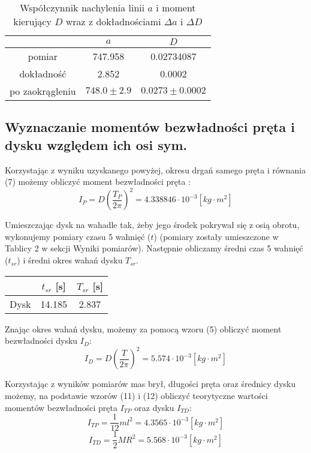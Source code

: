 \documentclass[10pt,a4paper]{article}
\newcommand{\forceindent}{\leavevmode{\parindent=3em\indent}}
\begin{document}
\begin{table}[!h]
\centering
\begin{tabular}{|cc||c|}
\multicolumn{1}{c}{} & \multicolumn{1}{c}{$a$} & \multicolumn{1}{c}{$D$}\\
\hline
pomiar & 747.958& 0.02734087\\
\hline
dokładność & 2.852 & 0.0002\\
\hline
po zaokrągleniu & $ 748.0 \pm 2.9 $  & $ 0.0273 \pm 0.0002 $ \\
\hline
\end{tabular}
\caption{Współczynnik nachylenia linii $a$ i moment kierujący $D$ wraz z dokładnościami $\Delta a$ i $\Delta D$}
\end{table}

\subsection{Wyznaczanie momentów bezwładności pręta i dysku względem ich osi sym.}
\forceindent Korzystając z wyniku uzyskanego powyżej, okresu drgań samego pręta i równania (7) możemy obliczyć moment bezwładności pręta :
\begin{equation}
I_P = D \left(\frac{T_P}{2\pi}\right)^2 = 4.338846\cdot 10^{-3} \left[kg\cdot m^2\right]
\end{equation}

\forceindent Umieszczając dysk na wahadle tak, żeby jego środek pokrywał się z osią obrotu, wykonujemy pomiary czasu 5 wahnięć ($t$) (pomiary zostały umieszczone w Tablicy 2 w sekcji Wyniki pomiarów). Następnie obliczamy średni czas 5 wahnięć ($t_{sr}$) i średni okres wahań dysku $T_{sr}$. 


\begin{table}[!h]
\centering
\begin{tabular}{|c||c|c|}
\hline
& $t_{sr}$ [s] & $T_{sr}$ [s] \\
\hline	
\hline
Dysk& 14.185 & 2.837 \\ \hline
\end{tabular}
\end{table}

Znając okres wahań dysku, możemy za pomocą wzoru (5) obliczyć moment bezwładności dysku $I_D$:
\begin{equation}
I_D = D \left(\frac{T}{2\pi}\right)^2 = 5.574\cdot 10^{-3} \left[kg\cdot m^2\right]
\end{equation}

\forceindent Korzystając z wyników pomiarów mas brył, długości pręta oraz średnicy dysku możemy, na podstawie wzorów (11) i (12) obliczyć teorytyczne wartości momentów bezwładności pręta $I_{TP}$ oraz dysku $I_{TD}$:
\begin{equation}
I_{TP} = \frac{1}{12}ml^2 = 4.3565\cdot 10^{-3} \left[kg\cdot m^2\right]
\end{equation}
\begin{equation}
I_{TD} = \frac{1}{2}MR^2 = 5.568\cdot 10^{-3} \left[kg\cdot m^2\right]
\end{equation}
\end{document}
